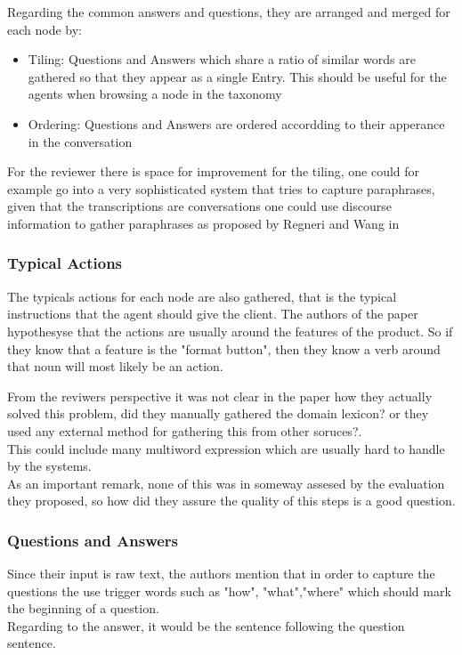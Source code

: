 \documentclass[4pt,a4paper,twocolumn]{article}
\begin{document}
Regarding the common answers and questions, they are arranged and merged for each node by:
\begin{itemize}
	\item Tiling:  Questions and Answers which share a ratio of similar words are gathered so that they appear as a single
				  Entry. This should be useful for the agents when browsing a node in the taxonomy
	\item Ordering: Questions and Answers are ordered accordding to their apperance in the conversation
\end{itemize}


For the reviewer there is space for improvement for the tiling, one could for example go into a very sophisticated system that tries to capture paraphrases, given that the transcriptions are conversations one could use discourse information to gather paraphrases as proposed by Regneri and Wang in ~\cite{pub6382}

\subsubsection*{Typical Actions}
The typicals actions for each node are also gathered, that is the typical instructions that the agent should give the client.
The authors of the paper hypothesyse that the actions are usually around the features of the product. So if they know that a feature is the "format button", then they know a verb around that noun will most likely  be an action.

From the reviwers perspective it was not clear in the paper how they actually solved this problem, did they manually gathered the domain lexicon? or they used any external method for gathering this from other soruces?.\\
This could include many multiword expression which are usually hard to handle by the systems.\\
As an important remark, none of this was in someway assesed by the evaluation they proposed, so how did they assure the quality of this steps is a  good question.


\subsubsection*{Questions and Answers}
Since their input is raw text, the authors mention that in order to capture the questions the use trigger words such as "how", "what","where" which should mark the beginning of a question.\\
Regarding to the answer, it would be the sentence following the question sentence.
\end{document}
